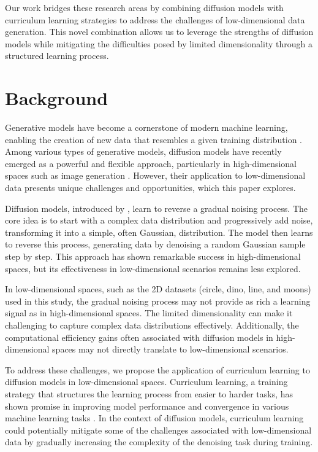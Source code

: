 \documentclass{article} %
\begin{document}
Our work bridges these research areas by combining diffusion models with curriculum learning strategies to address the challenges of low-dimensional data generation. This novel combination allows us to leverage the strengths of diffusion models while mitigating the difficulties posed by limited dimensionality through a structured learning process.

\section{Background}
\label{sec:background}

Generative models have become a cornerstone of modern machine learning, enabling the creation of new data that resembles a given training distribution \cite{goodfellow2016deep}. Among various types of generative models, diffusion models have recently emerged as a powerful and flexible approach, particularly in high-dimensional spaces such as image generation \cite{ddpm}. However, their application to low-dimensional data presents unique challenges and opportunities, which this paper explores.

Diffusion models, introduced by \citet{pmlr-v37-sohl-dickstein15}, learn to reverse a gradual noising process. The core idea is to start with a complex data distribution and progressively add noise, transforming it into a simple, often Gaussian, distribution. The model then learns to reverse this process, generating data by denoising a random Gaussian sample step by step. This approach has shown remarkable success in high-dimensional spaces, but its effectiveness in low-dimensional scenarios remains less explored.

In low-dimensional spaces, such as the 2D datasets (circle, dino, line, and moons) used in this study, the gradual noising process may not provide as rich a learning signal as in high-dimensional spaces. The limited dimensionality can make it challenging to capture complex data distributions effectively. Additionally, the computational efficiency gains often associated with diffusion models in high-dimensional spaces may not directly translate to low-dimensional scenarios.

To address these challenges, we propose the application of curriculum learning to diffusion models in low-dimensional spaces. Curriculum learning, a training strategy that structures the learning process from easier to harder tasks, has shown promise in improving model performance and convergence in various machine learning tasks \cite{goodfellow2016deep}. In the context of diffusion models, curriculum learning could potentially mitigate some of the challenges associated with low-dimensional data by gradually increasing the complexity of the denoising task during training.
\end{document}
